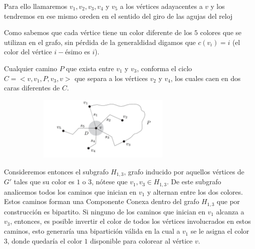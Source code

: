 \documentclass[a4paper,1pt]{report}
\begin{document}
Para ello %
llamaremos $v_1,v_2,v_3,v_4$ y $v_5$ a los vértices adayacentes a $v$ y los tendremos en ese mismo oreden en el sentido del giro de las agujas del reloj 

Como sabemos que cada v\'ertice tiene un color diferente de los $5$ colores que se utilizan en el grafo, sin p\'erdida de la generaldidad digamos que $c(v_i) = i$ (el color del v\'ertice $i-$\'esimo es $i$).

Cualquier camino $P$ que exista entre $v_1$ y $v_3$, conforma el ciclo $C = <v, v_1, P, v_3,v>$ que separa a los v\'ertices $v_2$ y $v_4$, los cuales caen en dos caras diferentes de $C$.

\begin{figure}[H]
    \centering
    \begin{subfigure}[b]{0.90\textwidth}
        \centering
        \includegraphics[width=0.7\textwidth]{figures6/5col.png}
    \end{subfigure} 
\end{figure} 

Consideremos entonces el subgrafo $H_{1,3}$, grafo inducido por aquellos v\'ertices de $G'$ tales que su color es $1$ o $3$, n\'otese que $v_1, v_3 \in H_{1,3}$. De este subgrafo analicemos todos los caminos que inician en $v_1$ y alternan entre los dos colores. Estos caminos forman una Componente Conexa dentro del grafo $H_{1,3}$ que por construcci\'on es bipartito.
Si ninguno de los caminos que inician en $v_1$ alcanza a $v_3$, entonces, es posible invertir el color de todos los v\'ertices involucrados en estos caminos, esto generar\'ia una bipartici\'on v\'alida en la cual a $v_1$ se le asigna el color $3$, donde quedar\'ia el color $1$ disponible para colorear al v\'ertice $v$.
\end{document}
